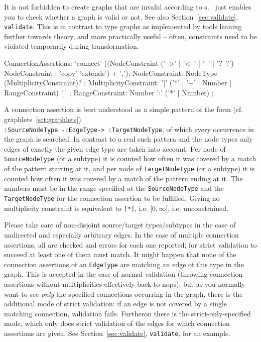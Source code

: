 \begin{warning}
It is not forbidden to create graphs that are invalid according to s.
\GrG\ just enables you to check whether a graph is valid or not.
See also Section~\ref{sec:validate}, \texttt{validate}.
This is in contrast to type graphs as implemented by tools leaning further towards theory, and more practically useful -- often, constraints need to be violated temporarily during transformation. 
\end{warning}

\begin{rail}
  ConnectionAssertions: 'connect' ((NodeConstraint ('-->' | '<--' | '--' | '?--?') NodeConstraint | 'copy' 'extends') + ',');
  NodeConstraint: NodeType (MultiplicityConstraint)? ;
  MultiplicityConstraint: '[' ('*' | '+' | Number | RangeConstraint) ']' ;
  RangeConstraint: Number ':' ('*' | Number) ;
\end{rail}\label{sct:ConnectionAssertions}

\pagebreak

A connection assertion is best understood as a simple pattern of the form (cf. graphlets~\ref{sct:graphlets})\\
\texttt{:SourceNodeType -:EdgeType-> :TargetNodeType}, of which every occurrence in the graph is searched.
In contrast to a real such pattern and the node types only edges of exactly the given edge type are taken into account.
Per node of \texttt{SourceNodeType} (or a subtype) it is counted how often it was covered by a match of the pattern starting at it,
and per node of \texttt{TargetNodeType} (or a subtype) it is counted how often it was covered by a match of the pattern ending at it.
The numbers must be in the range specified at the \texttt{SourceNodeType} and the \texttt{TargetNodeType} for the connection assertion to be fulfilled.
Giving no multiplicity constraint is equivalent to \verb#[*]#, i.e. $[0,\infty[$, i.e. unconstrained.

Please take care of non-disjoint source/target types/subtypes in the case of undirected and especially arbitrary edges.
In the case of multiple connection assertions, all are checked and errors for each one reported; for strict validation to succeed at least one of them must match.
It might happen that none of the connection assertions of an \texttt{EdgeType} are matching an edge of this type in the graph.
This is accepted in the case of normal validation (throwing connection assertions without multiplicities effectively back to nops);
but as you normally want to see \emph{only} the specified connections occurring in the graph,
there is the additional mode of strict validation: if an edge is not covered by a single matching connection, validation fails.
Furtheron there is the strict-only-specified mode, which only does strict validation of the edges for which connection assertions are given.
See Section~\ref{sec:validate}, \texttt{validate}, for an example.

